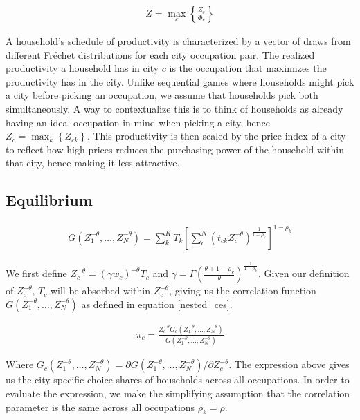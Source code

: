 \documentclass[10pt]{article}
\begin{document}
\begin{align}
    Z = \max_c \left\{ \frac{Z_c}{\Phi_c} \right\}
\end{align}

A household's schedule of productivity is characterized by a vector of draws from different Fr\'{e}chet distributions for each city occupation pair. The realized productivity a household has in city $c$ is the occupation that maximizes the productivity has in the city. Unlike sequential games where households might pick a city before picking an occupation, we assume that households pick both simultaneously. A way to contextualize this is to think of households as already having an ideal occupation in mind when picking a city, hence $Z_c = \max_k \left\{ Z_{ck} \right\}$. This productivity is then scaled by the price index of a city to reflect how high prices reduces the purchasing power of the household within that city, hence making it less attractive.

\subsection{Equilibrium}

\begin{align}
    G(Z_1^{- \theta}, \dots, Z_N^{- \theta}) = \sum_{k}^{K} T_k \left[ \sum_{c}^{N} (t_{ck} Z_c^{- \theta})^{\frac{1}{1 - \rho_k}} \right]^{1 - \rho_k}
    \label{nested_ces}
\end{align}

We first define $Z_c^{- \theta} = (\gamma w_c)^{- \theta} T_c$ and $\gamma = \Gamma (\frac{\theta + 1 - \rho_k}{\theta})^{\frac{1}{1 - \rho_k}}$. Given our definition of $Z_c^{- \theta}$, $T_c$ will be absorbed within $Z_c^{- \theta}$, giving us the correlation function $G(Z_1^{- \theta}, \dots, Z_N^{- \theta})$ as defined in equation \ref{nested_ces}.

\begin{align*}
    \pi_c = \frac{Z_c^{- \theta} G_c(Z_1^{- \theta}, \dots, Z_N^{- \theta})}{G(Z_1^{- \theta}, \dots, Z_N^{- \theta})}
\end{align*}

Where $G_c (Z_1^{- \theta}, \dots, Z_N^{- \theta}) = \partial G(Z_1^{- \theta}, \dots, Z_N^{- \theta}) / \partial Z_c^{- \theta}$. The expression above gives us the city specific choice shares of households across all occupations. In order to evaluate the expression, we make the simplifying assumption that the correlation parameter is the same across all occupations $\rho_k = \rho$.
\end{document}

